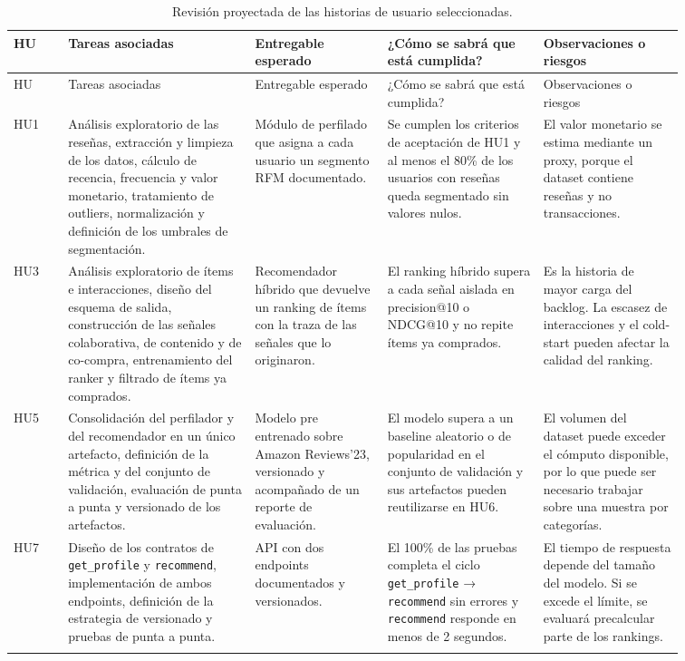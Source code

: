 \documentclass[
11pt, %
]{charter}
\begin{document}
\begin{longtable}{|>{\raggedright\arraybackslash}p{0.07\linewidth}|>{\raggedright\arraybackslash}p{0.24\linewidth}|>{\raggedright\arraybackslash}p{0.17\linewidth}|>{\raggedright\arraybackslash}p{0.20\linewidth}|>{\raggedright\arraybackslash}p{0.18\linewidth}|}
\hline
\rowcolor[HTML]{C0C0C0}
HU & Tareas asociadas & Entregable esperado & ¿Cómo se sabrá que está cumplida? & Observaciones o riesgos \\ \hline
\endfirsthead
\hline
\rowcolor[HTML]{C0C0C0}
HU & Tareas asociadas & Entregable esperado & ¿Cómo se sabrá que está cumplida? & Observaciones o riesgos \\ \hline
\endhead
HU1 & Análisis exploratorio de las reseñas, extracción y limpieza de los datos, cálculo de recencia, frecuencia y valor monetario, tratamiento de outliers, normalización y definición de los umbrales de segmentación. & Módulo de perfilado que asigna a cada usuario un segmento RFM documentado. & Se cumplen los criterios de aceptación de HU1 y al menos el 80\% de los usuarios con reseñas queda segmentado sin valores nulos. & El valor monetario se estima mediante un proxy, porque el dataset contiene reseñas y no transacciones. \\ \hline
HU3 & Análisis exploratorio de ítems e interacciones, diseño del esquema de salida, construcción de las señales colaborativa, de contenido y de co-compra, entrenamiento del ranker y filtrado de ítems ya comprados. & Recomendador híbrido que devuelve un ranking de ítems con la traza de las señales que lo originaron. & El ranking híbrido supera a cada señal aislada en precision@10 o NDCG@10 y no repite ítems ya comprados. & Es la historia de mayor carga del backlog. La escasez de interacciones y el cold-start pueden afectar la calidad del ranking. \\ \hline
HU5 & Consolidación del perfilador y del recomendador en un único artefacto, definición de la métrica y del conjunto de validación, evaluación de punta a punta y versionado de los artefactos. & Modelo pre entrenado sobre Amazon Reviews'23, versionado y acompañado de un reporte de evaluación. & El modelo supera a un baseline aleatorio o de popularidad en el conjunto de validación y sus artefactos pueden reutilizarse en HU6. & El volumen del dataset puede exceder el cómputo disponible, por lo que puede ser necesario trabajar sobre una muestra por categorías. \\ \hline
HU7 & Diseño de los contratos de \texttt{get\_profile} y \texttt{recommend}, implementación de ambos endpoints, definición de la estrategia de versionado y pruebas de punta a punta. & API con dos endpoints documentados y versionados. & El 100\% de las pruebas completa el ciclo \texttt{get\_profile} → \texttt{recommend} sin errores y \texttt{recommend} responde en menos de 2 segundos. & El tiempo de respuesta depende del tamaño del modelo. Si se excede el límite, se evaluará precalcular parte de los rankings. \\ \hline
\caption{Revisión proyectada de las historias de usuario seleccionadas.}
\label{tab:sprintReview}
\end{longtable}
\end{document}
